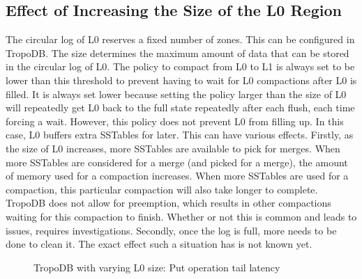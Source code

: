\subsection{Effect of Increasing the Size of the L0 Region}
\label{sec:evalL0}
The circular log of L0 reserves a fixed number of zones. This can be configured in TropoDB. The size determines the maximum amount of data that can be stored in the circular log of L0. The policy to compact from L0 to L1 is always set to be lower than this threshold to prevent having to wait for L0 compactions after L0 is filled. It is always set lower because setting the policy larger than the size of L0 will repeatedly get L0 back to the full state repeatedly after each flush, each time forcing a wait. However, this policy does not prevent L0 from filling up. In this case, L0 buffers extra SSTables for later. This can have various effects. Firstly, as the size of L0 increases, more SSTables are available to pick for merges. When more SSTables are considered for a merge (and picked for a merge), the amount of memory used for a compaction increases. When more SSTables are used for a compaction, this particular compaction will also take longer to complete. TropoDB does not allow for preemption, which results in other compactions waiting for this compaction to finish. Whether or not this is common and leads to issues, requires investigations. Secondly, once the log is full, more needs to be done to clean it. The exact effect such a situation has is not known yet.

\begin{figure}[!ht]
    \hspace*{-0.075\textwidth} %
    \raggedleft
    \caption{ TropoDB with varying L0 size: Put operation tail latency }
    \label{fig:l0reslat}
\end{figure}

